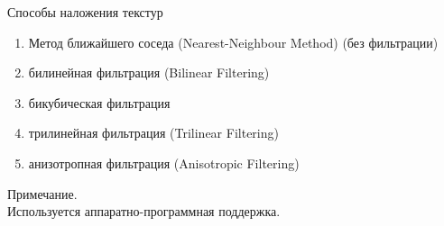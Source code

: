 \documentclass{beamer}
\begin{document}
	\begin{frame}{Способы наложения текстур}

		

		\begin{enumerate}
			\item Метод ближайшего соседа (Nearest-Neighbour Method) (без фильтрации)
			\item билинейная фильтрация (Bilinear Filtering)
			\item бикубическая фильтрация 
			\item трилинейная фильтрация (Trilinear Filtering)
			\item анизотропная фильтрация (Anisotropic Filtering)
		\end{enumerate}

		Примечание. \\ 
		Используется аппаратно-программная поддержка.\\


	\end{frame}
\end{document}
